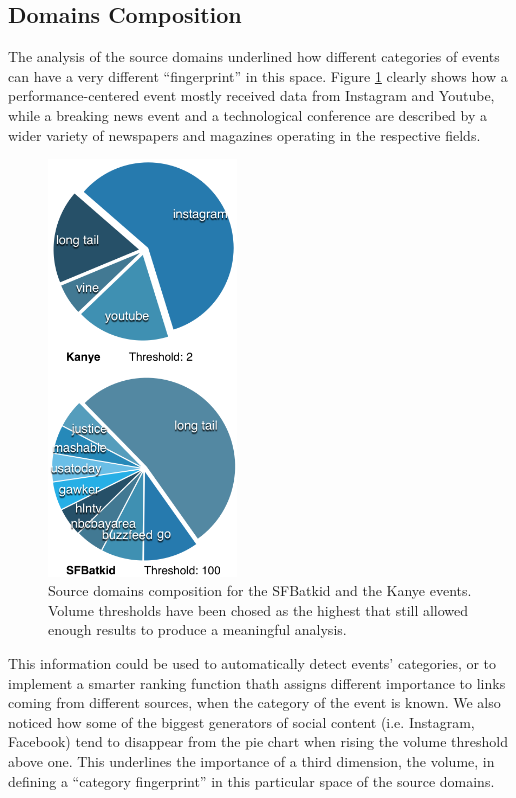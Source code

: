 \documentclass{sig-alternate}
\begin{document}
\subsection{Domains Composition}
\label{sec:domains_composition}
The analysis of the source domains underlined how different categories of events can have a very different ``fingerprint'' in this space. Figure \ref{fig:category_domains} clearly shows how a performance-centered event mostly received data from Instagram and Youtube, while a breaking news event and a technological conference are described by a wider variety of newspapers and magazines operating in the respective fields.
\begin{figure}[htbp]
  \centering
  \includegraphics[width=5cm]{Figures/category_domains.png}
  \caption{Source domains composition for the SFBatkid and the Kanye events. Volume thresholds have been chosed as the highest that still allowed enough results to produce a meaningful analysis.}
  \label{fig:category_domains}
\end{figure}
This information could be used to automatically detect events' categories, or to implement a smarter ranking function thath assigns different importance to links coming from different sources, when the category of the event is known. We also noticed how some of the biggest generators of social content (i.e. Instagram, Facebook) tend to disappear from the pie chart when rising the volume threshold above one. This underlines the importance of a third dimension, the volume, in defining a ``category fingerprint'' in this particular space of the source domains.
\end{document}
